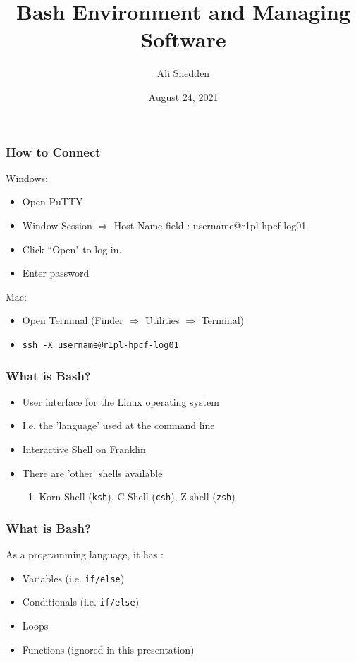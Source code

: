 \documentclass{beamer}
\title{Bash Environment and Managing Software}
\author{Ali Snedden}
\institute{Nationwide Children's Hospital}
\date{August 24, 2021}
\newcommand{\code}[1]{\colorbox{codegray}{\texttt{#1}}}
\begin{document}
 
\frame{\titlepage}




\begin{frame}
\frametitle{How to Connect}
Windows:
\begin{itemize}
    \item Open PuTTY
    \item Window Session $\Rightarrow$ Host Name field : username@r1pl-hpcf-log01
    \item Click ``Open" to log in.
    \item Enter password
\end{itemize}

Mac:
\begin{itemize}
    \item Open Terminal (Finder $\Rightarrow$ Utilities $\Rightarrow$ Terminal)
    \item \code{ssh -X username@r1pl-hpcf-log01}
\end{itemize}
\end{frame}



\begin{frame}
\frametitle{What is Bash?}
\begin{itemize}
    \item User interface for the Linux operating system
    \pause
    \item I.e. the 'language' used at the command line
    \pause
    \item Interactive Shell on Franklin
    \pause
    \item There are 'other' shells available
    \begin{enumerate}
        \item Korn Shell (\code{ksh}), C Shell (\code{csh}), Z shell (\code{zsh})
    \end{enumerate}
\end{itemize}
\end{frame}


\begin{frame}
\frametitle{What is Bash?}
As a programming language, it has :
\begin{itemize}
    \item Variables (i.e. \code{if/else})
    \pause
    \item Conditionals (i.e. \code{if/else})
    \pause
    \item Loops 
    \pause
    \item Functions (ignored in this presentation)
\end{itemize}
\end{frame}
\end{document}
